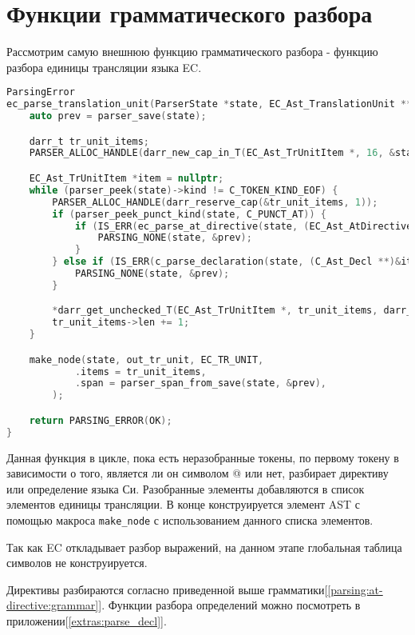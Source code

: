\section{Функции грамматического разбора}

Рассмотрим самую внешнюю функцию грамматического разбора - функцию разбора единицы трансляции языка EC.
\begin{lstlisting}[language=c, caption={Функция разбора единицы трансляции}, label={parsing:ec-parse-tr-unit}]
ParsingError
ec_parse_translation_unit(ParserState *state, EC_Ast_TranslationUnit **out_tr_unit) {
    auto prev = parser_save(state);

    darr_t tr_unit_items;
    PARSER_ALLOC_HANDLE(darr_new_cap_in_T(EC_Ast_TrUnitItem *, 16, &state->ast_alloc, &tr_unit_items));

    EC_Ast_TrUnitItem *item = nullptr;
    while (parser_peek(state)->kind != C_TOKEN_KIND_EOF) {
        PARSER_ALLOC_HANDLE(darr_reserve_cap(&tr_unit_items, 1));
        if (parser_peek_punct_kind(state, C_PUNCT_AT)) {
            if (IS_ERR(ec_parse_at_directive(state, (EC_Ast_AtDirective **)&item))) {
                PARSING_NONE(state, &prev);
            }
        } else if (IS_ERR(c_parse_declaration(state, (C_Ast_Decl **)&item))) {
            PARSING_NONE(state, &prev);
        }

        *darr_get_unchecked_T(EC_Ast_TrUnitItem *, tr_unit_items, darr_len(tr_unit_items)) = item;
        tr_unit_items->len += 1;
    }

    make_node(state, out_tr_unit, EC_TR_UNIT, 
            .items = tr_unit_items,
            .span = parser_span_from_save(state, &prev),
        );

    return PARSING_ERROR(OK);
}
\end{lstlisting}

Данная функция в цикле, пока есть неразобранные токены, по первому токену в зависимости о того, 
является ли он символом @ или нет, разбирает директиву или определение языка Си. 
Разобранные элементы добавляются в список элементов единицы трансляции.
В конце конструируется элемент AST с помощью макроса \verb|make_node| с использованием данного списка элементов.

Так как EC откладывает разбор выражений, на данном этапе глобальная таблица символов не конструируется.

Директивы разбираются согласно приведенной выше грамматики[\ref{parsing:at-directive:grammar}].
Функции разбора определений можно посмотреть в приложении[\ref{extras:parse_decl}].

